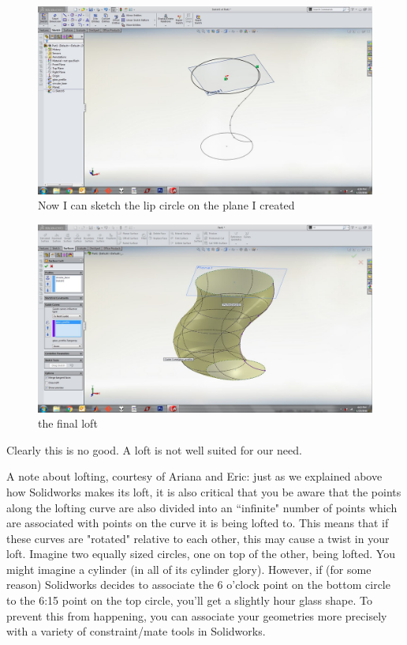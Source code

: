 \documentclass{article}
\begin{document}
\begin{figure}[h!]
    \centering
    \includegraphics[width=1\textwidth]{figs_and_code/QEA_secondCircle}
    \caption{Now I can sketch the lip circle on the plane I created}
\end{figure}

\begin{figure}[h!]
    \centering
    \includegraphics[width=1\textwidth]{figs_and_code/QEA_lofting}
    \caption{the final loft}
\end{figure}

Clearly this is no good. A loft is not well suited for our need.

A note about lofting, courtesy of Ariana and Eric: just as we explained above how Solidworks makes its loft, it is also critical that you be aware that the points along the lofting curve are also divided into an ``infinite" number of points which are associated with points on the curve it is being lofted to. This means that if these curves are "rotated" relative to each other, this may cause a twist in your loft. Imagine two equally sized circles, one on top of the other, being lofted. You might imagine a cylinder (in all of its cylinder glory). However, if (for some reason) Solidworks decides to associate the 6 o'clock point on the bottom circle to the 6:15 point on the top circle, you'll get a slightly hour glass shape. To prevent this from happening, you can associate your geometries more precisely with a variety of constraint/mate tools in Solidworks. 
\end{document}
